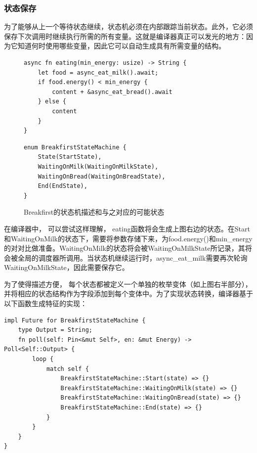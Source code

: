 \subsubsection{状态保存}

为了能够从上一个等待状态继续，状态机必须在内部跟踪当前状态。此外，它必须保存下次调用时继续执行所需的所有变量。这就是编译器真正可以发光的地方：因为它知道何时使用哪些变量，因此它可以自动生成具有所需变量的结构。

\begin{figure}[htbp]
    \figureCapSet
	\centering
	\begin{minipage}{0.49\linewidth}%
		\centering
        \begin{lstlisting}[frame=none]
async fn eating(min_energy: usize) -> String {
    let food = async_eat_milk().await;
    if food.energy() < min_energy {
        content + &async_eat_bread().await
    } else {
        content
    }
}
        \end{lstlisting}
	\end{minipage}
    \hfill
	\begin{minipage}{0.49\linewidth}
		\centering
        \begin{lstlisting}[frame=none]
enum BreakfirstStateMachine {
    State(StartState),
    WaitingOnMilk(WaitingOnMilkState),
    WaitingOnBread(WaitingOnBreadState),
    End(EndState),
}
        \end{lstlisting}
	\end{minipage}
    \caption{Breakfirst的状态机描述和与之对应的可能状态}
\end{figure}


在编译器中， 可以尝试这样理解， eating函数将会生成上图右边的状态。在Start和WaitingOnMilk的状态下，需要将参数存储下来，为food.energy()和min\_energy的对对比做准备。WaitingOnMilk的状态将会被WaitingOnMilkState所记录，其将会被全局的调度器所调用。当状态机继续运行时，async\_eat\_milk需要再次轮询WaitingOnMilkState，因此需要保存它。

为了使得描述方便， 每个状态都被定义一个单独的枚举变体（如上图右半部分），并将相应的状态结构作为字段添加到每个变体中。为了实现状态转换，编译器基于以下函数生成特征的实现：

\begin{lstlisting}[caption=Breakfirst的状态转换]
impl Future for BreakfirstStateMachine {
    type Output = String;
    fn poll(self: Pin<&mut Self>, en: &mut Energy) -> Poll<Self::Output> {
        loop {
            match self {
                BreakfirstStateMachine::Start(state) => {}
                BreakfirstStateMachine::WaitingOnMilk(state) => {}
                BreakfirstStateMachine::WaitingOnBread(state) => {}
                BreakfirstStateMachine::End(state) => {}
            }
        }
    }
}
\end{lstlisting}

